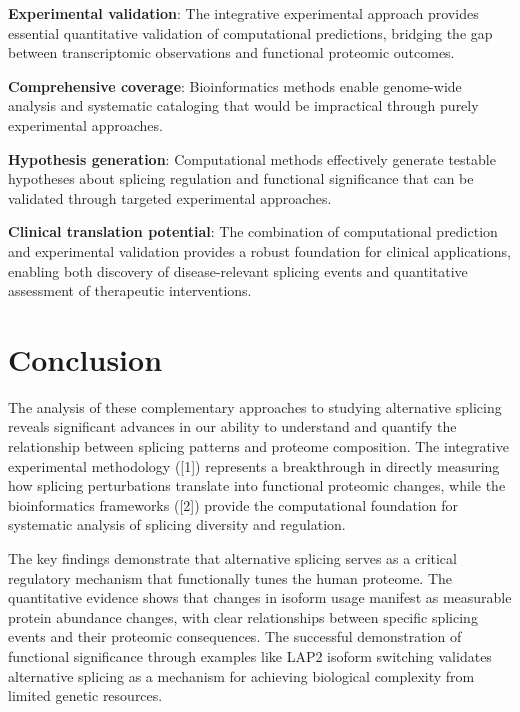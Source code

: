 \documentclass[12pt,a4paper]{article}
\begin{document}
\textbf{Experimental validation}: The integrative experimental approach provides essential quantitative validation of computational predictions, bridging the gap between transcriptomic observations and functional proteomic outcomes.

\textbf{Comprehensive coverage}: Bioinformatics methods enable genome-wide analysis and systematic cataloging that would be impractical through purely experimental approaches.

\textbf{Hypothesis generation}: Computational methods effectively generate testable hypotheses about splicing regulation and functional significance that can be validated through targeted experimental approaches.

\textbf{Clinical translation potential}: The combination of computational prediction and experimental validation provides a robust foundation for clinical applications, enabling both discovery of disease-relevant splicing events and quantitative assessment of therapeutic interventions.

\section{Conclusion}

The analysis of these complementary approaches to studying alternative splicing reveals significant advances in our ability to understand and quantify the relationship between splicing patterns and proteome composition. The integrative experimental methodology ([1]) represents a breakthrough in directly measuring how splicing perturbations translate into functional proteomic changes, while the bioinformatics frameworks ([2]) provide the computational foundation for systematic analysis of splicing diversity and regulation.

The key findings demonstrate that alternative splicing serves as a critical regulatory mechanism that functionally tunes the human proteome. The quantitative evidence shows that changes in isoform usage manifest as measurable protein abundance changes, with clear relationships between specific splicing events and their proteomic consequences. The successful demonstration of functional significance through examples like LAP2 isoform switching validates alternative splicing as a mechanism for achieving biological complexity from limited genetic resources.
\end{document}
